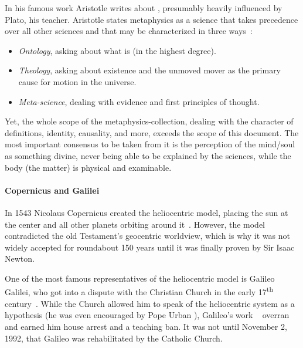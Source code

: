 In his famous work  Aristotle writes about , presumably heavily influenced by Plato, his teacher.
Aristotle states metaphysics as a science that takes precedence over all other sciences and that may be characterized in three ways~\cite{aristotle350}:
\begin{itemize}
    \item \emph{Ontology}, asking about what  is (in the highest degree).
    \item \emph{Theology}, asking about existence and the unmoved mover as the primary cause for motion in the universe.
    \item \emph{Meta-science}, dealing with evidence and first principles of thought.
\end{itemize}
Yet, the whole scope of the metaphysics-collection, dealing with the character of definitions, identity, causality, and more, exceeds the scope of this document.
The most important consensus to be taken from it is the perception of the mind/soul as something divine, never being able to be explained by the sciences,
while the body (the matter) is physical and examinable.


\paragraph{Copernicus and Galilei} In 1543 Nicolaus Copernicus created the heliocentric model, placing the sun at the center and all other planets orbiting around it~\cite{copernicus1965revolutionibus}.
However, the model contradicted the old Testament's geocentric worldview, which is why it was not widely accepted for roundabout 150 years until it was finally proven by Sir Isaac Newton.

One of the most famous representatives of the heliocentric model is Galileo Galilei, who got into a dispute with the Christian Church in the early 17\textsuperscript{th} century~\cite{folsing1983galileo}.
While the Church allowed him to speak of the heliocentric system as a hypothesis (he was even encouraged by Pope Urban ), Galileo's work ~\cite{galilei1632dialogo} overran and earned him house arrest and a teaching ban.
It was not until November 2, 1992, that Galileo was rehabilitated by the Catholic Church.


